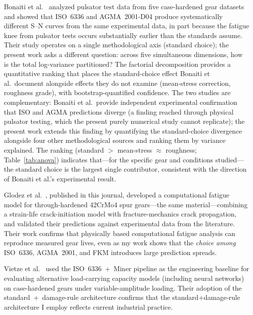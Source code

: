 \documentclass[twocolumn,12pt,a4paper]{article}
\begin{document}
Bonaiti et al.~\cite{bonaiti2024} analyzed pulsator test data from five
case-hardened gear datasets and showed that ISO~6336 and AGMA~2001-D04
produce systematically different S--N curves from the same experimental
data, in part because the fatigue knee from pulsator tests occurs
substantially earlier than the standards assume. Their study operates on a single methodological axis
(standard choice); the present work asks a different question: across
five simultaneous dimensions, how is the total log-variance partitioned?
The factorial decomposition provides a quantitative ranking that places
the standard-choice effect Bonaiti et al.\ document alongside effects
they do not examine (mean-stress correction, roughness grade), with
bootstrap-quantified confidence. The two studies are complementary: Bonaiti et al.\ provide
independent experimental confirmation that ISO and AGMA predictions
diverge (a finding reached through physical pulsator testing, which
the present purely numerical study cannot replicate); the present
work extends this finding by quantifying the standard-choice
divergence alongside four other methodological sources and ranking
them by variance explained. The ranking (standard $>$ mean-stress
$\approx$ roughness; Table~\ref{tab:anova}) indicates that---for the
specific gear and conditions studied---the standard choice is the
largest single contributor, consistent with the direction of
Bonaiti et al.'s experimental result.

Glodez et al.~\cite{glodez2002}, published in this journal, developed a
computational fatigue model for through-hardened 42CrMo4 spur
gears---the same material---combining a strain-life crack-initiation
model with fracture-mechanics crack propagation, and validated their
predictions against experimental data from the literature. Their work
confirms that physically based computational fatigue analysis can
reproduce measured gear lives, even as my work shows that the
\emph{choice among} ISO~6336, AGMA~2001, and FKM introduces large
prediction spreads.

Vietze et al.~\cite{vietze2024} used the ISO~6336~+~Miner pipeline as the
engineering baseline for evaluating alternative load-carrying capacity
models (including neural networks) on case-hardened gears under
variable-amplitude loading. Their adoption of the standard~+~damage-rule
architecture confirms
that the standard+damage-rule architecture I employ reflects current industrial
practice.
\end{document}
